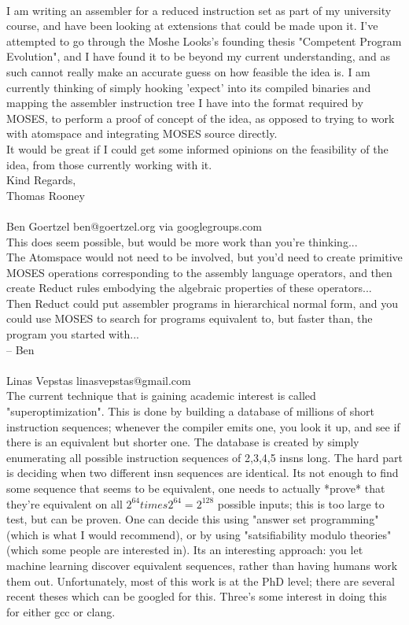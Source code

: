 \documentclass[11pt]{article}
\begin{document}
\\
I am writing an assembler for a reduced instruction set as part of my university course, and have been looking at extensions that could be made upon it. I've attempted to go through the Moshe Looks's founding thesis "Competent Program Evolution", and I have found it to be beyond my current understanding, and as such cannot really make an accurate guess on how feasible the idea is. I am currently thinking of simply hooking 'expect' into its compiled binaries and mapping the assembler instruction tree I have into the format required by MOSES, to perform a proof of concept of the idea, as opposed to trying to work with atomspace and integrating MOSES source directly.
\\
It would be great if I could get some informed opinions on the feasibility of the idea, from those currently working with it.
\\
Kind Regards,
\\
Thomas Rooney
\\
\\
Ben Goertzel ben@goertzel.org via googlegroups.com 
\\This does seem possible, but would be more work than you're thinking...
\\The Atomspace would not need to be involved, but you'd need to create
primitive MOSES operations corresponding to the assembly language
operators, and then create Reduct rules embodying the algebraic
properties of these operators...
\\Then Reduct could put assembler programs in hierarchical normal form,
and you could use MOSES to search for programs equivalent to, but
faster than, the program you started with...
\\-- Ben
\\
\\
Linas Vepstas linasvepstas@gmail.com
\\The current technique that is gaining academic interest is called "superoptimization". This is done by building a database of millions of short instruction sequences; whenever the compiler emits one, you look it up, and see if there is an equivalent but shorter one. The database is created by simply enumerating all possible instruction sequences of 2,3,4,5 insns long. The hard part is deciding when two different insn sequences are identical. Its not enough to find some sequence that seems to be equivalent, one needs to actually *prove* that they're equivalent on all $2^64 times 2^64 = 2^128$ possible inputs; this is too large to test, but can be proven. One can decide this using "answer set programming" (which is what I would recommend), or by using "satsifiability modulo theories" (which some people are interested in). Its an interesting approach: you let machine learning discover equivalent sequences, rather than having humans work them out. Unfortunately, most of this work is at the PhD level; there are several recent theses which can be googled for this. Three's some interest in doing this for either gcc or clang.
\end{document}

